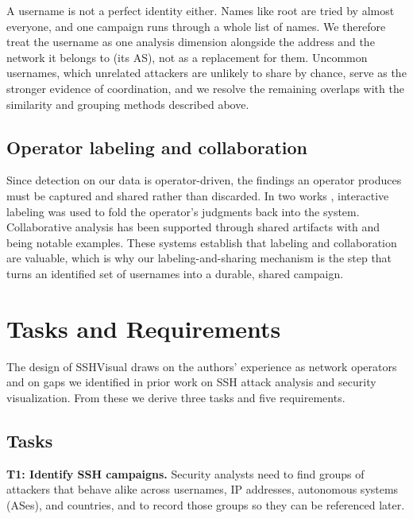 \documentclass[10pt,twocolumn]{article}   %
\begin{document}
A username is not a perfect identity either. Names like root are tried by almost everyone, and one campaign runs through a whole list of names. 
We therefore treat the username as one analysis dimension alongside the address and the network it belongs to (its AS), not as a replacement for them. 
Uncommon usernames, which unrelated attackers are unlikely to share by chance, serve as the stronger evidence of coordination, and we resolve the remaining 
overlaps with the similarity and grouping methods described above.

\subsection{Operator labeling and collaboration}
Since detection on our data is operator-driven, the findings an operator produces must be captured and shared rather than discarded. 
In two works \cite{guerra2019study, xiao2006enhancing}, interactive labeling was used to fold the operator's judgments back into the system. Collaborative analysis has been 
supported through shared artifacts with \cite{chen2014oceans} and \cite{goodall2009viassist} being notable examples. These systems establish that labeling and collaboration are valuable, 
which is why our labeling-and-sharing mechanism is the step that turns an identified set of usernames into a durable, shared campaign.


\section{Tasks and Requirements}

The design of SSHVisual draws on the authors' experience as network operators and on gaps we identified in prior work on SSH attack analysis and security visualization. 
From these we derive three tasks and five requirements. 

\subsection{Tasks}
\label{sec:tasks}

\textbf{T1: Identify SSH campaigns.} Security analysts need to find groups of attackers that behave alike across usernames, IP addresses, autonomous systems (ASes), and countries, 
and to record those groups so they can be referenced later.
\end{document}
